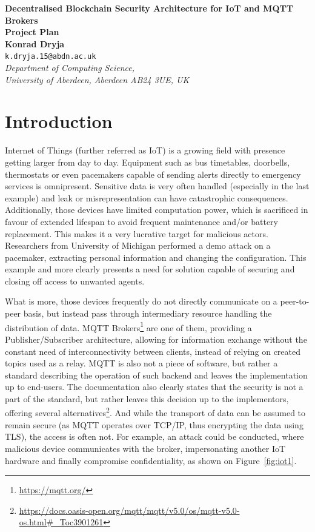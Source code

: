 \documentclass[a4paper,12pt]{article}
\begin{document}
\begin{center}
{\Large\bf{Decentralised Blockchain Security Architecture for IoT and MQTT Brokers}} \\
      \vspace{5.0mm}
{\Large\bf{Project Plan}} \\
      \vspace{8mm}
      {\large\bf{Konrad Dryja}}  \\
      \vspace{5.0mm}
       {\tt k.dryja.15@abdn.ac.uk} \\
      \vspace{5.0mm}
      {\em Department of Computing Science,\\
       University of Aberdeen, Aberdeen AB24 3UE, UK} 
\end{center}


\section*{Introduction}

Internet of Things (further referred as IoT) is a growing field with presence getting larger from day to day. Equipment such as bus timetables, doorbells, thermostats or even pacemakers capable of sending alerts directly to emergency services is omnipresent. Sensitive data is very often handled (especially in the last example) and leak or misrepresentation can have catastrophic consequences. Additionally, those devices have limited computation power, which is sacrificed in favour of extended lifespan to avoid frequent maintenance and/or battery replacement. This makes it a very lucrative target for malicious actors. Researchers from University of Michigan performed a demo attack on a pacemaker, extracting personal information and changing the configuration.\cite{4531149} This example and more clearly presents a need for solution capable of securing and closing off access to unwanted agents.

What is more, those devices frequently do not directly communicate on a peer-to-peer basis, but instead pass through intermediary resource handling the distribution of data. MQTT Brokers\footnote{\url{https://mqtt.org/}} are one of them, providing a Publisher/Subscriber architecture, allowing for information exchange without the constant need of interconnectivity between clients, instead of relying on created topics used as a relay. MQTT is also not a piece of software, but rather a standard describing the operation of such backend and leaves the implementation up to end-users. The documentation also clearly states that the security is not a part of the standard, but rather leaves this decision up to the implementors, offering several alternatives\footnote{\url{https://docs.oasis-open.org/mqtt/mqtt/v5.0/os/mqtt-v5.0-os.html\#\_Toc3901261}}. And while the transport of data can be assumed to remain secure (as MQTT operates over TCP/IP, thus encrypting the data using TLS), the access is often not. For example, an attack could be conducted, where malicious device communicates with the broker, impersonating another IoT hardware and finally compromise confidentiality, as shown on Figure~\ref{fig:iot1}.
\end{document}
